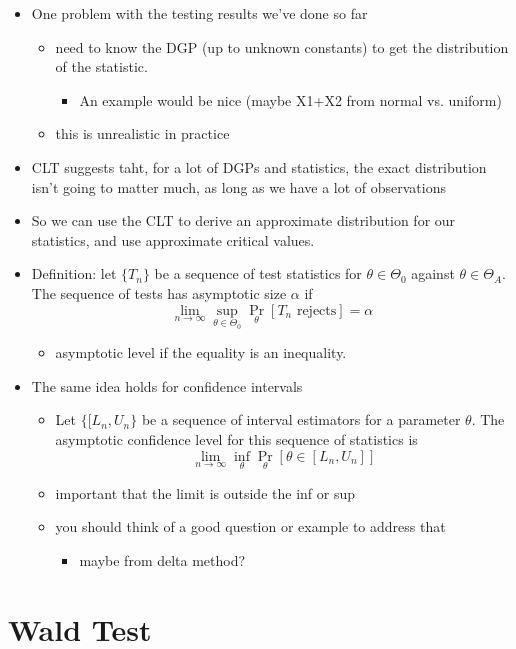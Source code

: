 \begin{itemize}
\item One problem with the testing results we've done so far
\begin{itemize}
\item need to know the DGP (up to unknown constants) to get the
        distribution of the statistic.
\begin{itemize}
\item An example would be nice (maybe X1+X2 from normal vs. uniform)
\end{itemize}
\item this is unrealistic in practice
\end{itemize}
\item CLT suggests taht, for a lot of DGPs and statistics, the exact
      distribution isn't going to matter much, as long as we have a
      lot of observations
\item So we can use the CLT to derive an approximate distribution for
      our statistics, and use approximate critical values.
\item Definition: let $\{T_n\}$ be a sequence of test statistics for
      $\theta \in \Theta_0$ against $\theta \in \Theta_A$.  The
      sequence of tests has asymptotic size $\alpha$ if 
      \[\lim_{n \to \infty} \sup_{\theta \in \Theta_0} \Pr_\theta[T_n \text{ rejects}] = \alpha\]
\begin{itemize}
\item asymptotic level if the equality is an inequality.
\end{itemize}
\item The same idea holds for confidence intervals
\begin{itemize}
\item Let $\{[L_n, U_n\}$ be a sequence of interval estimators for a
        parameter $\theta$.  The asymptotic confidence level for this
        sequence of statistics is
        \[\lim_{n\to\infty} \inf_\theta \Pr_{\theta}[\theta \in [L_n, U_n]]\]
\item important that the limit is outside the inf or sup
\item you should think of a good question or example to address that
\begin{itemize}
\item maybe from delta method?
\end{itemize}
\end{itemize}
\end{itemize}

\section{Wald Test}

